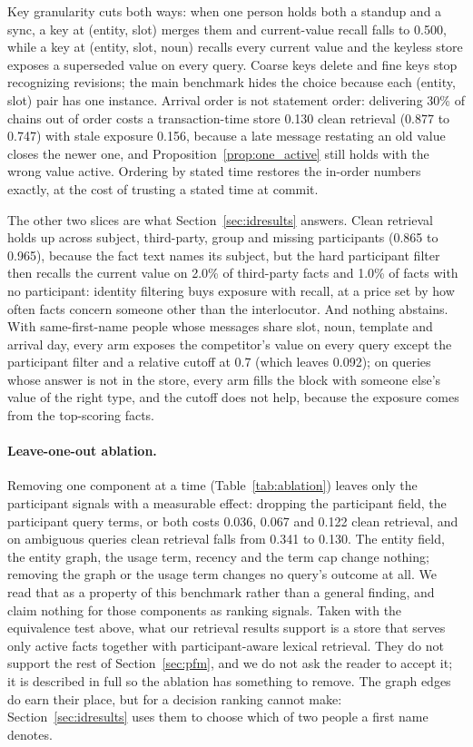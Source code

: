 \documentclass{article} %
\begin{document}
Key granularity cuts both ways: when one person holds both a standup and a sync, a key at (entity, slot) merges them and current-value recall falls to 0.500, while a key at (entity, slot, noun) recalls every current value and the keyless store exposes a superseded value on every query. Coarse keys delete and fine keys stop recognizing revisions; the main benchmark hides the choice because each (entity, slot) pair has one instance. Arrival order is not statement order: delivering 30\% of chains out of order costs a transaction-time store 0.130 clean retrieval (0.877 to 0.747) with stale exposure 0.156, because a late message restating an old value closes the newer one, and Proposition~\ref{prop:one_active} still holds with the wrong value active. Ordering by stated time restores the in-order numbers exactly, at the cost of trusting a stated time at commit.

The other two slices are what Section~\ref{sec:idresults} answers. Clean retrieval holds up across subject, third-party, group and missing participants (0.865 to 0.965), because the fact text names its subject, but the hard participant filter then recalls the current value on 2.0\% of third-party facts and 1.0\% of facts with no participant: identity filtering buys exposure with recall, at a price set by how often facts concern someone other than the interlocutor. And nothing abstains. With same-first-name people whose messages share slot, noun, template and arrival day, every arm exposes the competitor's value on every query except the participant filter and a relative cutoff at 0.7 (which leaves 0.092); on queries whose answer is not in the store, every arm fills the block with someone else's value of the right type, and the cutoff does not help, because the exposure comes from the top-scoring facts.

\paragraph{Leave-one-out ablation.}\label{sec:ablation}

Removing one component at a time (Table~\ref{tab:ablation}) leaves only the participant signals with a measurable effect: dropping the participant field, the participant query terms, or both costs 0.036, 0.067 and 0.122 clean retrieval, and on ambiguous queries clean retrieval falls from 0.341 to 0.130. The entity field, the entity graph, the usage term, recency and the term cap change nothing; removing the graph or the usage term changes no query's outcome at all. We read that as a property of this benchmark rather than a general finding, and claim nothing for those components as ranking signals. Taken with the equivalence test above, what our retrieval results support is a store that serves only active facts together with participant-aware lexical retrieval. They do not support the rest of Section~\ref{sec:pfm}, and we do not ask the reader to accept it; it is described in full so the ablation has something to remove. The graph edges do earn their place, but for a decision ranking cannot make: Section~\ref{sec:idresults} uses them to choose which of two people a first name denotes.
\end{document}
